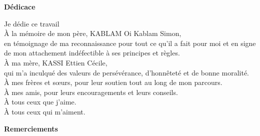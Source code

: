 \begin{center}
	\LARGE{\textbf{Dédicace}}
\end{center}

\begin{center}
	Je dédie ce travail\\
	\uppercase{à} la mémoire de mon père, KABLAM Oi Kablam Simon, \\ en témoignage de ma reconnaissance pour tout ce qu’il a fait pour moi et en signe de mon attachement indéfectible à ses principes et règles. \\
	\uppercase{à} ma mère, KASSI Ettien Cécile, \\ qui m'a inculqué des valeurs de persévérance, d'honnêteté et de bonne moralité. \\
	\uppercase{à} mes frères et sœurs, pour leur soutien tout au long de mon parcours.\\
	\uppercase{à} mes amis, pour leurs encouragements et leurs conseils.\\
	\uppercase{à} tous ceux que j'aime.\\
	\uppercase{à} tous ceux qui m'aiment.
\end{center} 

\newpage
{}
\begin{center}
	\LARGE{\textbf{Remerciements}}
\end{center}


